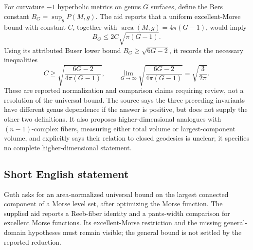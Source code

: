 \documentclass[11pt]{article}
\begin{document}
For curvature \(-1\) hyperbolic metrics on genus \(G\) surfaces, define the Bers constant \(B_G=\sup_g P(M,g)\). The aid reports that a uniform excellent-Morse bound with constant \(C\), together with \(\operatorname{area}(M,g)=4\pi(G-1)\), would imply
\[
 B_G\le2C\sqrt{\pi(G-1)}.
\]
Using its attributed Buser lower bound \(B_G\ge\sqrt{6G-2}\), it records the necessary inequalities
\[
 C\ge\sqrt{\frac{6G-2}{4\pi(G-1)}},\qquad
 \lim_{G\to\infty}\sqrt{\frac{6G-2}{4\pi(G-1)}}=\sqrt{\frac3{2\pi}}.
\]
These are reported normalization and comparison claims requiring review, not a resolution of the universal bound. The source says the three preceding invariants have different genus dependence if the answer is positive, but does not supply the other two definitions. It also proposes higher-dimensional analogues with \((n-1)\)-complex fibers, measuring either total volume or largest-component volume, and explicitly says their relation to closed geodesics is unclear; it specifies no complete higher-dimensional statement.
\subsection{Short English statement}
Guth asks for an area-normalized universal bound on the largest connected component of a Morse level set, after optimizing the Morse function. The supplied aid reports a Reeb-fiber identity and a pants-width comparison for excellent Morse functions. Its excellent-Morse restriction and the missing general-domain hypotheses must remain visible; the general bound is not settled by the reported reduction.
\end{document}
